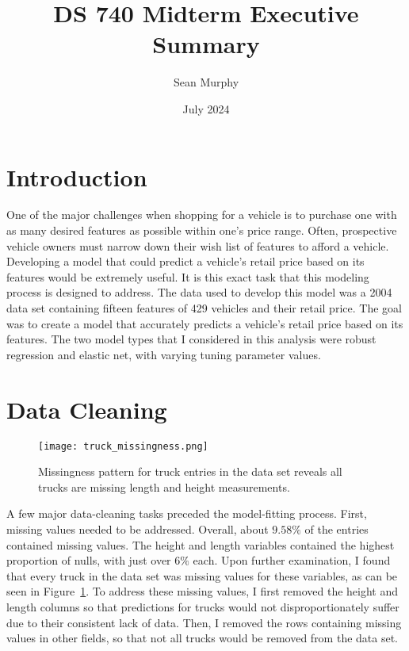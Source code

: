 \documentclass{article}
\title{DS 740 Midterm Executive Summary}
\author{Sean Murphy}
\date{July 2024}
\begin{document}
\maketitle

\section{Introduction}

One of the major challenges when shopping for a vehicle is to purchase one with as many desired 
features as possible within one's price range. Often, prospective vehicle owners must narrow down 
their wish list of features to afford a vehicle.  Developing a model that could predict a vehicle's 
retail price based on its features would be extremely useful.  It is this exact task that this 
modeling process is designed to address.  The data used to develop this model was a 2004 data set 
containing fifteen features of 429 vehicles and their retail price.  The goal was to create a model 
that accurately predicts a vehicle's retail price based on its features.  The two model types that I 
considered in this analysis were robust regression and elastic net, with varying tuning parameter 
values.

\section{Data Cleaning}

\begin{figure}
    \centering
    \texttt{[image: truck\_missingness.png]}
    \caption{Missingness pattern for truck entries in the data set reveals all trucks are missing 
    length and height measurements.}
    \label{fig:truck_missingness}
\end{figure}

A few major data-cleaning tasks preceded the model-fitting process. First, missing values needed to 
be addressed. Overall, about $9.58\%$ of the entries contained missing values. The height and length 
variables contained the highest proportion of nulls, with just over $6\%$ each. Upon further examination, 
I found that every truck in the data set was missing values for these variables, as can be seen in 
Figure~\ref{fig:truck_missingness}.  To address these missing values, I first removed the height and 
length columns so that predictions for trucks would not disproportionately suffer due to their consistent 
lack of data.  Then, I removed the rows containing missing values in other fields, so that not all trucks 
would be removed from the data set.  
\end{document}
